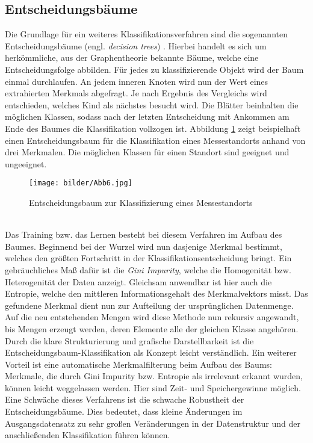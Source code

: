 \subsection{Entscheidungsbäume}\label{tree}
Die Grundlage für ein weiteres Klassifikationsverfahren sind die sogenannten Entscheidungsbäume (engl. \textit{decision trees}) \citep{rokach05}. Hierbei handelt es sich um herkömmliche, aus der Graphentheorie bekannte Bäume, welche eine Entscheidungsfolge abbilden. Für jedes zu klassifizierende Objekt wird der Baum einmal durchlaufen. An jedem inneren Knoten wird nun der Wert eines extrahierten Merkmals abgefragt. Je nach Ergebnis des Vergleichs wird entschieden, welches Kind als nächstes besucht wird. Die Blätter beinhalten die möglichen Klassen, sodass nach der letzten Entscheidung mit Ankommen am Ende des Baumes die Klassifikation vollzogen ist. Abbildung \ref{dtree} zeigt beispielhaft einen Entscheidungsbaum für die Klassifikation eines Messestandorts anhand von drei Merkmalen. Die möglichen Klassen für einen Standort sind \glqq geeignet\grqq{} und \glqq ungeeignet\grqq{}.
\begin{figure}[htb]
	\begin{center}
		\texttt{[image: bilder/Abb6.jpg]}
		\caption{Entscheidungsbaum zur Klassifizierung eines Messestandorts}\label{dtree}
	\end{center}
\end{figure}\\
Das Training bzw. das Lernen besteht bei diesem Verfahren im Aufbau des Baumes. Beginnend bei der Wurzel wird nun dasjenige Merkmal bestimmt, welches den größten Fortschritt in der Klassifikationsentscheidung bringt. Ein gebräuchliches Maß dafür ist die \textit{Gini Impurity}, welche die Homogenität bzw. Heterogenität der Daten anzeigt. Gleichsam anwendbar ist hier auch die Entropie, welche den mittleren Informationsgehalt des Merkmalvektors misst. Das gefundene Merkmal dient nun zur Aufteilung der ursprünglichen Datenmenge. Auf die neu entstehenden Mengen wird diese Methode nun rekursiv angewandt, bis Mengen erzeugt werden, deren Elemente alle der gleichen Klasse angehören.\\
Durch die klare Strukturierung und grafische Darstellbarkeit ist die Entscheidungsbaum-Klassifikation als Konzept leicht verständlich. Ein weiterer Vorteil ist eine automatische Merkmalfilterung beim Aufbau des Baums: Merkmale, die durch Gini Impurity bzw. Entropie als irrelevant erkannt wurden, können leicht weggelassen werden. Hier sind Zeit- und Speichergewinne möglich.\\
Eine Schwäche dieses Verfahrens ist die schwache Robustheit der Entscheidungsbäume. Dies bedeutet, dass kleine Änderungen im Ausgangsdatensatz zu sehr großen Veränderungen in der Datenstruktur und der anschließenden Klassifikation führen können.
